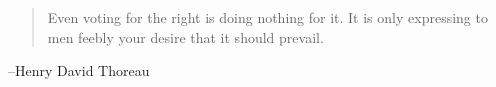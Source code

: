 \documentclass{exam}
\begin{document}
  \else
    \vspace{11 cm}
    \begin{quote}
      \begin{em}
        Even voting for the right is doing nothing for it. It is only expressing to men feebly your desire that it
        should prevail. 
      \end{em}
    \end{quote}
    \hspace{1 cm} --Henry David Thoreau
  \fi
\end{document}
